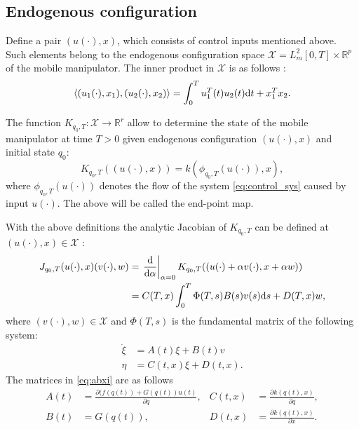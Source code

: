 \subsection{Endogenous configuration}
Define a pair $(u(\cdot), x)$, which consists of control inputs mentioned above.
Such elements belong to the endogenous configuration space
$\mathcal{X} = L_m^2[0, T] \times \mathbb{R}^p$ of the mobile manipulator.
The inner product in $\mathcal{X}$ is as follows \cite{ecs_ijc}:
\begin{equation}
\langle (u_1(\cdot), x_1), (u_2(\cdot), x_2) \rangle = \int_0^T u_1^T(t) u_2(t) \mathrm{d} t + x_1^T x_2.
\end{equation}

The function
$K_{q_0, T}: \mathcal{X} \rightarrow \mathbb{R}^r$
allow to determine the state of the mobile manipulator at time $T>0$ given
endogenous configuration $(u(\cdot), x)$ and initial state $q_0$:
\begin{equation}
K_{q_0, T}((u(\cdot), x)) = k(\phi_{q_0, T}(u(\cdot)), x),
\end{equation}
where $\phi_{q_0, T}(u(\cdot))$ denotes the flow of the system \eqref{eq:control_sys}
caused by input $u(\cdot)$. The above will be called the end-point map.

With the above definitions the analytic Jacobian of $K_{q_0, T}$ can be defined at $(u(\cdot), x) \in \mathcal{X}$ \cite{ratajczak2013multiple}:
\begin{align}
\label{eq:jacobian}
J_{q_0, T}(u(\cdot), x)(v(\cdot), w) &= \left.\frac{\mathrm{d}}{\mathrm{d} \alpha}\right|_{\alpha=0} K_{q_0, T}((u(\cdot)+\alpha v(\cdot), x+\alpha w))\\
 &= 
 C(T,x)\int_0^T \Phi(T,s)B(s)v(s)\mathrm{d} s + D(T,x)w,
\end{align}
where $(v(\cdot), w)\in \mathcal{X}$ and $\Phi(T,s)$ is the fundamental matrix of the following system:
\begin{equation}
\begin{aligned}
\label{eq:abxi}
\dot \xi &= A(t)\xi + B(t) v \\
\eta &= C(t, x)\xi + D(t, x).
\end{aligned}
\end{equation}
The matrices in \eqref{eq:abxi} are as follows \cite{tchon2004acceleration}
\begin{equation}
\begin{aligned}
A(t) &= \frac{\partial (f(q(t))+G(q(t))u(t)}{\partial q}, & C(t, x) &= \frac{\partial k(q(t), x)}{\partial q},\\
B(t) &= G(q(t)), & D(t, x) &= \frac{\partial k(q(t), x)}{\partial x}.
\end{aligned}
\end{equation}

